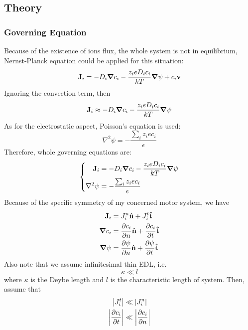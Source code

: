 \documentclass[fontsize=11pt, %
                             paper=a4, %
                             twoside, %
                             captions=tableheading,
                             index=totoc,
                             hyperref]{labbook}
\begin{document}
\begin{addmargin}[4cm]{0cm}
\subsection{Theory}
\subsubsection{Governing Equation}
Because of the existence of ions flux, the whole system is not in equilibrium, Nernst-Planck equation could be applied for this situation:
\begin{equation}
\mathbf{J}_i=-D_i\mbox{\boldmath$ \nabla $} c_i - \frac{z_i e D_i c_i}{kT}\mbox{\boldmath$ \nabla $} \psi+ c_i \mathbf{v}
\end{equation}
Ignoring the convection term, then
\begin{equation}
\mathbf{J}_i \approx -D_i\mbox{\boldmath$ \nabla $} c_i - \frac{z_i e D_i c_i}{kT}\mbox{\boldmath$ \nabla $} \psi
\end{equation}
As for the electrostatic aspect, Poisson's equation is used:
\begin{equation}
\nabla^2 \psi = - \frac{\sum_i z_i e c_i}{\epsilon}
\end{equation}
Therefore, whole governing equations are:
\begin{equation}
\left\{
\begin{aligned}
\mathbf{J}_i &= -D_i\mbox{\boldmath$ \nabla $} c_i - \frac{z_i e D_i c_i}{kT}\mbox{\boldmath$ \nabla $} \psi\\
\nabla^2 \psi &= - \frac{\sum_i z_i e c_i}{\epsilon}
\end{aligned}
\right.
\end{equation}
Because of the specific symmetry of my concerned motor system, we have
\begin{equation}
\begin{aligned}
\mathbf{J}_i&=J_i^n \mathbf{\hat{n}} +J_i^t \mathbf{\hat{t}}\\
\mbox{\boldmath$ \nabla $} c_i&=\frac{\partial c_i}{\partial n}\mathbf{\hat{n}} + \frac{\partial c_i}{\partial t}\mathbf{\hat{t}}\\
\mbox{\boldmath$ \nabla $} \psi&=\frac{\partial \psi}{\partial n}\mathbf{\hat{n}} + \frac{\partial \psi}{\partial t}\mathbf{\hat{t}}
\end{aligned}
\end{equation}
Also note that we assume infinitesimal thin EDL, i.e.
\begin{equation}
\kappa \ll l
\end{equation}
where $\kappa$ is the Deybe length and $l$ is the characteristic length of system. Then, assume that
\begin{equation}
\begin{aligned}
\abs{J_i^t}&\ll \abs{J_i^n}\\
\abs{\pd{c_i}{t}}&\ll\abs{\pd{c_i}{n}}\\

\end{aligned}
\end{equation}
\end{addmargin}
\end{document}
